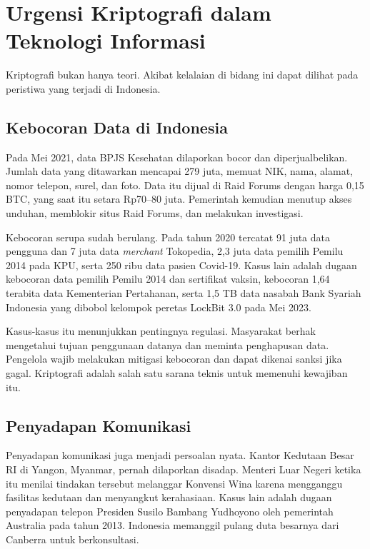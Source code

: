 \section{Urgensi Kriptografi dalam Teknologi Informasi}
\label{sec:urgensi}

Kriptografi bukan hanya teori. Akibat kelalaian di bidang ini dapat dilihat
pada peristiwa yang terjadi di Indonesia.

\subsection{Kebocoran Data di Indonesia}

Pada Mei 2021, data BPJS Kesehatan dilaporkan bocor dan diperjualbelikan. Jumlah
data yang ditawarkan mencapai 279 juta, memuat NIK, nama, alamat, nomor telepon,
surel, dan foto. Data itu dijual di Raid Forums dengan harga 0,15 BTC, yang saat
itu setara Rp70--80 juta. Pemerintah kemudian menutup akses unduhan, memblokir
situs Raid Forums, dan melakukan investigasi.

Kebocoran serupa sudah berulang. Pada tahun 2020 tercatat 91 juta data pengguna
dan 7 juta data \textit{merchant} Tokopedia, 2,3 juta data pemilih Pemilu 2014
pada KPU, serta 250 ribu data pasien Covid-19. Kasus lain adalah dugaan
kebocoran data pemilih Pemilu 2014 dan sertifikat vaksin, kebocoran 1,64 terabita
data Kementerian Pertahanan, serta 1,5 TB data nasabah Bank Syariah Indonesia
yang dibobol kelompok peretas LockBit 3.0 pada Mei 2023.

Kasus-kasus itu menunjukkan pentingnya regulasi. Masyarakat berhak mengetahui
tujuan penggunaan datanya dan meminta penghapusan data. Pengelola wajib
melakukan mitigasi kebocoran dan dapat dikenai sanksi jika gagal. Kriptografi
adalah salah satu sarana teknis untuk memenuhi kewajiban itu.

\subsection{Penyadapan Komunikasi}

Penyadapan komunikasi juga menjadi persoalan nyata. Kantor Kedutaan Besar RI di
Yangon, Myanmar, pernah dilaporkan disadap. Menteri Luar Negeri ketika itu
menilai tindakan tersebut melanggar Konvensi Wina karena mengganggu fasilitas
kedutaan dan menyangkut kerahasiaan. Kasus lain adalah dugaan penyadapan
telepon Presiden Susilo Bambang Yudhoyono oleh pemerintah Australia pada tahun
2013. Indonesia memanggil pulang duta besarnya dari Canberra untuk
berkonsultasi.

